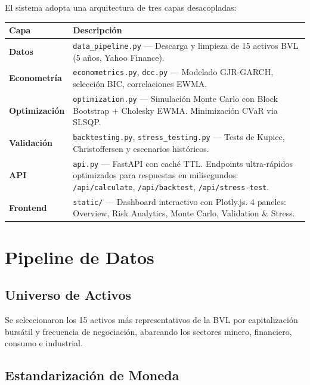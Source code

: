 \documentclass[11pt,a4paper]{article}
\begin{document}
El sistema adopta una arquitectura de tres capas desacopladas:

\begin{center}
\begin{tabular}{l l}
\toprule
\textbf{Capa} & \textbf{Descripción} \\
\midrule
\textbf{Datos} & \parbox[t]{12.5cm}{\texttt{data\_pipeline.py} — Descarga y limpieza de 15 activos BVL (5 años, Yahoo Finance).} \\[4pt]
\textbf{Econometría} & \parbox[t]{12.5cm}{\texttt{econometrics.py}, \texttt{dcc.py} — Modelado GJR-GARCH, selección BIC, correlaciones EWMA.} \\[4pt]
\textbf{Optimización} & \parbox[t]{12.5cm}{\texttt{optimization.py} — Simulación Monte Carlo con Block Bootstrap + Cholesky EWMA. Minimización CVaR via SLSQP.} \\[4pt]
\textbf{Validación} & \parbox[t]{12.5cm}{\texttt{backtesting.py}, \texttt{stress\_testing.py} — Tests de Kupiec, Christoffersen y escenarios históricos.} \\[4pt]
\textbf{API} & \parbox[t]{12.5cm}{\texttt{api.py} — FastAPI con caché TTL. Endpoints ultra-rápidos optimizados para respuestas en milisegundos: \texttt{/api/calculate}, \texttt{/api/backtest}, \texttt{/api/stress-test}.} \\[4pt]
\textbf{Frontend} & \parbox[t]{12.5cm}{\texttt{static/} — Dashboard interactivo con Plotly.js. 4 paneles: Overview, Risk Analytics, Monte Carlo, Validation \& Stress.} \\
\bottomrule
\end{tabular}
\end{center}

\section{Pipeline de Datos}

\subsection{Universo de Activos}

Se seleccionaron los 15 activos más representativos de la BVL por capitalización bursátil y
frecuencia de negociación, abarcando los sectores minero, financiero, consumo e industrial.

\subsection{Estandarización de Moneda}
\end{document}
